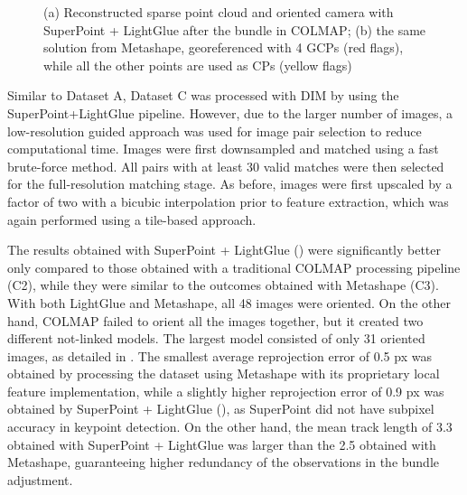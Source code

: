 \begin{figure}
  \centering
  \caption{(a) Reconstructed sparse point cloud and oriented camera with SuperPoint + LightGlue after the bundle in COLMAP; (b) the same solution from Metashape, georeferenced with 4 GCPs (red flags), while all the other points are used as CPs (yellow flags)}
  \label{fig:5:castle_rec}
\end{figure}

Similar to Dataset A, Dataset C was processed with DIM by using the SuperPoint+LightGlue pipeline. 
However, due to the larger number of images, a low-resolution guided approach was used for image pair selection to reduce computational time. 
Images were first downsampled and matched using a fast brute-force method. 
All pairs with at least 30 valid matches were then selected for the full-resolution matching stage.  
As before, images were first upscaled by a factor of two with a bicubic interpolation prior to feature extraction, which was again performed using a tile-based approach.

The results obtained with SuperPoint + LightGlue () were significantly better only compared to those obtained with a traditional COLMAP processing pipeline (C2), while they were similar to the outcomes obtained with Metashape (C3). 
With both LightGlue and Metashape, all 48 images were oriented. On the other hand, COLMAP failed to orient all the images together, but it created two different not-linked models. The largest model consisted of only 31 oriented images, as detailed in . 
The smallest average reprojection error of 0.5 px was obtained by processing the dataset using Metashape with its proprietary local feature implementation, while a slightly higher reprojection error of 0.9 px was obtained by SuperPoint + LightGlue (), as SuperPoint did not have subpixel accuracy in keypoint detection. 
On the other hand, the mean track length of 3.3 obtained with SuperPoint + LightGlue was larger than the 2.5 obtained with Metashape, guaranteeing higher redundancy of the observations in the bundle adjustment. 

